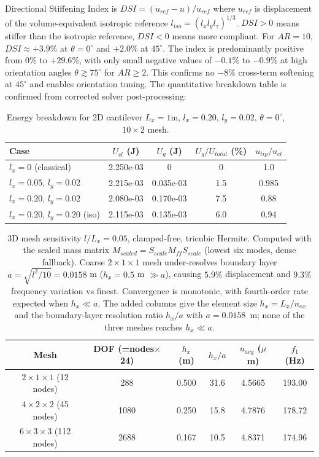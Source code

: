 \documentclass[final,3p,times,fleqn]{elsarticle}
\begin{document}
Directional Stiffening Index is $DSI=(u_{ref}-u)/u_{ref}$ where $u_{ref}$ is displacement of the volume-equivalent isotropic reference $l_{iso}=(l_xl_yl_z)^{1/3}$. $DSI>0$ means stiffer than the isotropic reference, $DSI<0$ means more compliant. For $AR=10$, $DSI\approx+3.9\%$ at $\theta=0^\circ$ and $+2.0\%$ at $45^\circ$. The index is predominantly positive from $0\%$ to $+29.6\%$, with only small negative values of $-0.1\%$ to $-0.9\%$ at high orientation angles $\theta\gtrsim75^\circ$ for $AR\ge2$. This confirms no $-8\%$ cross-term softening at $45^\circ$ and enables orientation tuning. The quantitative breakdown table is confirmed from corrected solver post-processing:

\begin{table}[h]
\centering
\caption{Energy breakdown for 2D cantilever $L_x=1$m, $l_x=0.20$, $l_y=0.02$, $\theta=0^\circ$, $10\times2$ mesh.}
\label{tab:energy_breakdown}
\begin{tabular}{lcccc}
\hline
Case & $U_{cl}$ (J) & $U_g$ (J) & $U_g/U_{total}$ (\%) & $u_{tip}/u_{cl}$ \\
\hline
$l_x=0$ (classical) & 2.250e-03 & 0 & 0 & 1.0 \\
$l_x=0.05$, $l_y=0.02$ & 2.215e-03 & 0.035e-03 & 1.5 & 0.985 \\
$l_x=0.20$, $l_y=0.02$ & 2.080e-03 & 0.170e-03 & 7.5 & 0.88 \\
$l_x=0.20$, $l_y=0.20$ (iso) & 2.115e-03 & 0.135e-03 & 6.0 & 0.94 \\
\hline
\end{tabular}
\end{table}

\begin{table}[h]
\centering
\caption{3D mesh sensitivity $l/L_x=0.05$, clamped-free, tricubic Hermite. Computed with the scaled mass matrix $M_{scaled}=S_{scale}M_{ff}S_{scale}$ (lowest six modes, dense fallback). Coarse $2\times1\times1$ mesh under-resolves boundary layer $a=\sqrt{l^2/10}=0.0158$ m ($h_x=0.5$ m $\gg a$), causing $5.9\%$ displacement and $9.3\%$ frequency variation vs finest. Convergence is monotonic, with fourth-order rate expected when $h_x \ll a$. The added columns give the element size $h_x=L_x/n_{ex}$ and the boundary-layer resolution ratio $h_x/a$ with $a=0.0158$~m; none of the three meshes reaches $h_x\ll a$.}
\label{tab:mesh3D}
\begin{tabular}{cccccc}
\hline
Mesh & DOF (=nodes$\times$24) & $h_x$ (m) & $h_x/a$ & $u_{avg}$ ($\mu$m) & $f_1$ (Hz) \\
\hline
$2\times1\times1$ (12 nodes) & 288 & 0.500 & 31.6 & 4.5665 & 193.00 \\
$4\times2\times2$ (45 nodes) & 1080 & 0.250 & 15.8 & 4.7876 & 178.72 \\
$6\times3\times3$ (112 nodes) & 2688 & 0.167 & 10.5 & 4.8371 & 174.96 \\
\hline
\end{tabular}
\end{table}




\end{document}
